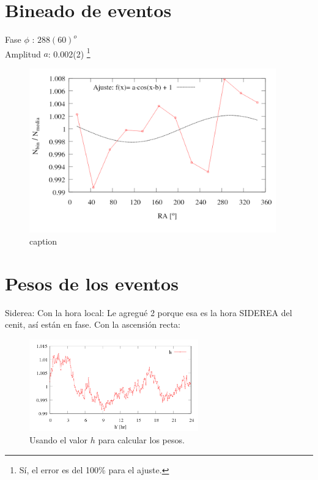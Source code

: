 
\section{Bineado de eventos}

		
	Fase $\phi$ : $288(60)^o$  \\
	Amplitud $a$: 0.002(2) \footnote{Sí, el error es del 100\% para el ajuste.}  	 \\
		


\begin{figure}[H]
	\centering
	\includegraphics[width=0.95\textwidth]{bineado_eventos_herald_por_RA.png}
	\caption{caption}
\end{figure}

\section{Pesos de los eventos}

			Siderea:
				Con la hora local: Le agregué 2 porque esa es la hora SIDEREA del cenit, así están en fase.
				Con la ascensión recta:
		
		
		
		\begin{figure}[H]
			\centering
			\includegraphics[width=0.65\textwidth]{eventos_hora_local.png}
			\caption{Usando el valor $h$ para calcular los pesos.}
		\end{figure}
		
